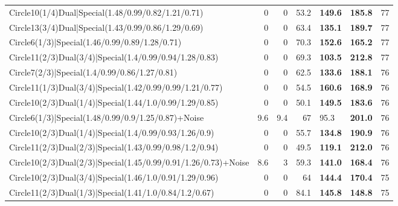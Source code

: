 \begin{tabular}{lrrrllr}
 Circle10(1/4)Dual|Special(1.48/0.99/0.82/1.21/0.71)            &          0   &            0   &          53.2 & \textbf{149.6} & \textbf{185.8} &           77 \\
 Circle13(3/4)Dual|Special(1.43/0.99/0.86/1.29/0.69)            &          0   &            0   &          63.4 & \textbf{135.1} & \textbf{189.7} &           77 \\
 Circle6(1/3)|Special(1.46/0.99/0.89/1.28/0.71)                 &          0   &            0   &          70.3 & \textbf{152.6} & \textbf{165.2} &           77 \\
 Circle11(2/3)Dual(3/4)|Special(1.4/0.99/0.94/1.28/0.83)        &          0   &            0   &          69.3 & \textbf{103.5} & \textbf{212.8} &           77 \\
 Circle7(2/3)|Special(1.4/0.99/0.86/1.27/0.81)                  &          0   &            0   &          62.5 & \textbf{133.6} & \textbf{188.1} &           76 \\
 Circle11(1/3)Dual(3/4)|Special(1.42/0.99/0.99/1.21/0.77)       &          0   &            0   &          54.5 & \textbf{160.6} & \textbf{168.9} &           76 \\
 Circle10(2/3)Dual(1/4)|Special(1.44/1.0/0.99/1.29/0.85)        &          0   &            0   &          50.1 & \textbf{149.5} & \textbf{183.6} &           76 \\
 Circle6(1/3)|Special(1.48/0.99/0.9/1.25/0.87)+Noise            &          9.6 &            9.4 &          67   & 95.3           & \textbf{201.0} &           76 \\
 Circle10(2/3)Dual(1/4)|Special(1.4/0.99/0.93/1.26/0.9)         &          0   &            0   &          55.7 & \textbf{134.8} & \textbf{190.9} &           76 \\
 Circle11(2/3)Dual(2/3)|Special(1.43/0.99/0.98/1.2/0.94)        &          0   &            0   &          49.5 & \textbf{119.1} & \textbf{212.0} &           76 \\
 Circle10(2/3)Dual(2/3)|Special(1.45/0.99/0.91/1.26/0.73)+Noise &          8.6 &            3   &          59.3 & \textbf{141.0} & \textbf{168.4} &           76 \\
 Circle10(2/3)Dual(3/4)|Special(1.46/1.0/0.91/1.29/0.96)        &          0   &            0   &          64   & \textbf{144.4} & \textbf{170.4} &           75 \\
 Circle11(2/3)Dual(1/3)|Special(1.41/1.0/0.84/1.2/0.67)         &          0   &            0   &          84.1 & \textbf{145.8} & \textbf{148.8} &           75 \\

\end{tabular}
